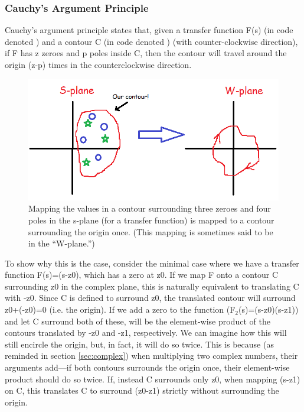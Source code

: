 \subsubsection{Cauchy's Argument Principle}
Cauchy's argument principle states that, given a transfer function F(s) (in code denoted ) and a contour C (in code denoted ) (with counter-clockwise direction), if F has z zeroes and p poles inside C, then the contour  will travel around the origin (z-p) times in the counterclockwise direction. 

\begin{figure}[h!]
    \centering
    \includegraphics[scale= 0.4]{Images/sw.PNG}
    \caption{Mapping the values in a contour surrounding three zeroes and four poles in the s-plane (for a transfer function) is mapped to a contour surrounding the origin once. (This mapping is sometimes said to be in the ``W-plane.'')}
    \label{Cauchy}
\end{figure}

To show why this is the case, %
consider the minimal case where we have a transfer function F(s)=(s-z0), which has a zero at z0. If we map F onto a contour C surrounding z0 in the complex plane, this is naturally equivalent to translating C with -z0. Since C is defined to surround z0, the translated contour will surround z0+(-z0)=0 (i.e. the origin). 
If we add a zero to the function (F$_2$(s)=(s-z0)(s-z1)) and let C surround both of these,  will be the element-wise product of the contours translated by -z0 and -z1, respectively. We can imagine how this will still encircle the origin, but, in fact, it will do so twice. This is because (as reminded in section \ref{sec:complex}) when multiplying two complex numbers, their arguments add---if both contours surrounds the origin once, their element-wise product should do so twice.
If, instead C surrounds only z0, when mapping (s-z1) on C, this translates C to surround (z0-z1) strictly without surrounding the origin.

